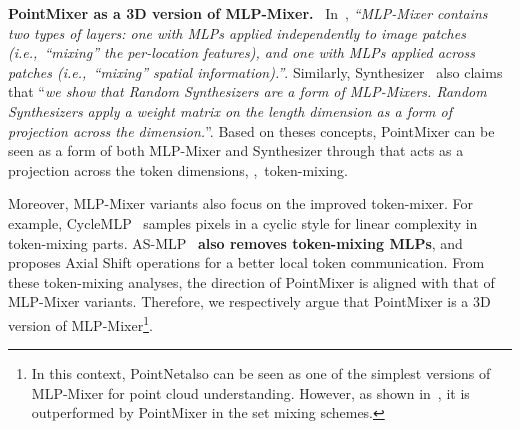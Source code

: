 \noindent\textbf{PointMixer as a 3D version of MLP-Mixer.} \
In~\cite{mlp-mixer},
\textit{“MLP-Mixer contains two types of layers: one with MLPs applied independently to image patches (i.e.,~“mixing” the per-location features), and one with MLPs applied across patches (i.e.,~“mixing” spatial information).”}. Similarly, Synthesizer~\cite{synthesizer} also claims that ``\textit{we show that Random Synthesizers are a form of MLP-Mixers. Random Synthesizers apply a weight matrix on the length dimension as a form of projection across the dimension.}''. 
Based on theses concepts, PointMixer can be seen as a form of both MLP-Mixer and
Synthesizer through  that acts as a projection across the token dimensions, \ie,~token-mixing.


Moreover, MLP-Mixer variants\cite{cyclemlp,vision-permutator,as-mlp,spatial-sift-mlp-v2} also focus on the improved token-mixer.
For example, CycleMLP~\cite{cyclemlp} samples pixels in a cyclic style for linear complexity in token-mixing parts.
AS-MLP~\cite{as-mlp} \textbf{also removes token-mixing MLPs}, and proposes Axial Shift operations for a better local token communication.
From these token-mixing analyses, the direction of PointMixer is aligned with that of MLP-Mixer variants.
Therefore, we respectively argue that PointMixer is a 3D version of MLP-Mixer\footnote{In this context, PointNet\plusplus also can be seen as one of the simplest versions of MLP-Mixer for point cloud understanding. However, as shown in~, it is outperformed by PointMixer in the set mixing schemes.}.

